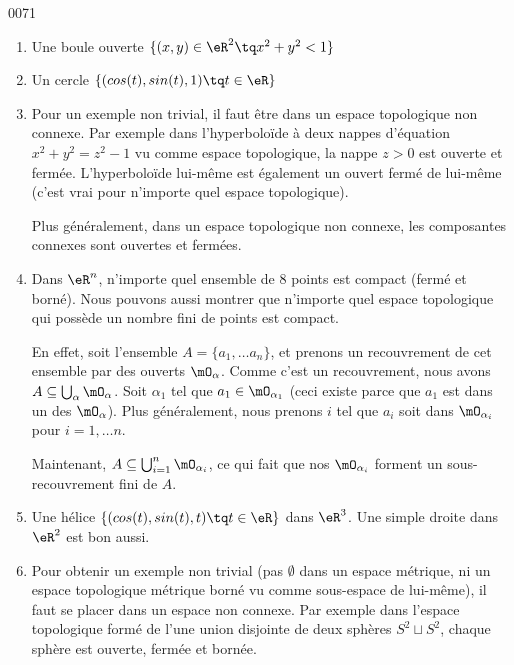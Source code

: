 
\begin{corrige}{0071}

\begin{enumerate}
	\item Une boule ouverte $\{ (x,y) \in \eR^2 \tq x^2+y^2 < 1\}$
	\item Un cercle $\{ (cos(t),sin(t),1) \tq t \in \eR\}$
	\item Pour un exemple non trivial, il faut être dans un espace topologique non connexe. Par exemple dans l'hyperboloïde à deux nappes d'équation $x^2 + y^2 = z^2 - 1$ vu comme espace topologique, la nappe $z > 0$ est ouverte et fermée. L'hyperboloïde lui-même est également un ouvert fermé de lui-même (c'est vrai pour n'importe quel espace topologique).

		Plus généralement, dans un espace topologique non connexe, les composantes connexes sont ouvertes et fermées.
	\item Dans $\eR^n$, n'importe quel ensemble de $8$ points est compact (fermé et borné). Nous pouvons aussi montrer que n'importe quel espace topologique qui possède un nombre fini de points est compact. 

En effet, soit l'ensemble $A=\{ a_1,\ldots a_n \}$, et prenons un recouvrement de cet ensemble par des ouverts $\mO_{\alpha}$. Comme c'est un recouvrement, nous avons $A\subseteq\bigcup_{\alpha}\mO_{\alpha}$. Soit $\alpha_1$ tel que $a_1\in\mO_{\alpha_1}$ (ceci existe parce que $a_1$ est dans un des $\mO_{\alpha}$). Plus généralement, nous prenons $i$ tel que $a_i$ soit dans $\mO_{\alpha_i}$ pour $i=1,\ldots n$.

Maintenant, $A\subseteq\bigcup_{i=1}^n\mO_{\alpha_i}$, ce qui fait que nos $\mO_{\alpha_i}$ forment un sous-recouvrement fini de $A$.

	\item Une hélice $\{ (cos(t),sin(t),t) \tq t \in \eR\}$ dans $\eR^3$. Une simple droite dans $\eR^2$ est bon aussi.
	\item Pour obtenir un exemple non trivial (pas $\emptyset$ dans un espace métrique, ni un espace topologique métrique borné vu comme sous-espace de lui-même), il faut se placer dans un espace non connexe. Par exemple dans l'espace topologique formé de l'une union disjointe de deux sphères $S^2 \sqcup S^2$, chaque sphère est ouverte, fermée et bornée.
\end{enumerate}

\end{corrige}
